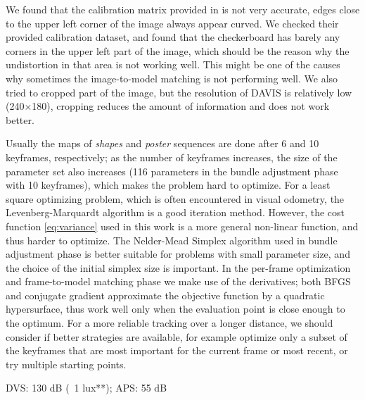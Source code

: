 We found that the calibration matrix provided in
\citep{mueggler2017event} is not very accurate, edges close to the
upper left corner of the image always appear curved. We checked their
provided calibration dataset, and found that the checkerboard has
barely any corners in the upper left part of the image, which should
be the reason why the undistortion in that area is not working
well. This might be one of the causes why sometimes the image-to-model
matching is not performing well. We also tried to cropped part of the
image, but the resolution of DAVIS is relatively low (240$\times$180),
cropping reduces the amount of information and does not work better.

Usually the maps of \emph{shapes} and \emph{poster} sequences are done
after 6 and 10 keyframes, respectively; as the number of keyframes
increases, the size of the parameter set also increases (116
parameters in the bundle adjustment phase with 10 keyframes), which
makes the problem hard to optimize. For a least square optimizing
problem, which is often encountered in visual odometry, the
Levenberg-Marquardt algorithm\citep{press1988numerical} is a good
iteration method. However, the cost function \cref{eq:variance} used
in this work is a more general non-linear function, and thus harder to
optimize. The Nelder-Mead Simplex algorithm\citep{nelder1965simplex}
used in bundle adjustment phase is better suitable for problems with
small parameter size, and the choice of the initial simplex size is
important. In the per-frame optimization and frame-to-model matching
phase we make use of the derivatives; both BFGS and conjugate gradient
approximate the objective function by a quadratic hypersurface, thus
work well only when the evaluation point is close enough to the
optimum. For a more reliable tracking over a longer distance, we
should consider if better strategies are available, for example
optimize only a subset of the keyframes that are most important for
the current frame or most recent, or try multiple starting points.

DVS: 130 dB (~1 lux**); APS: 55 dB
